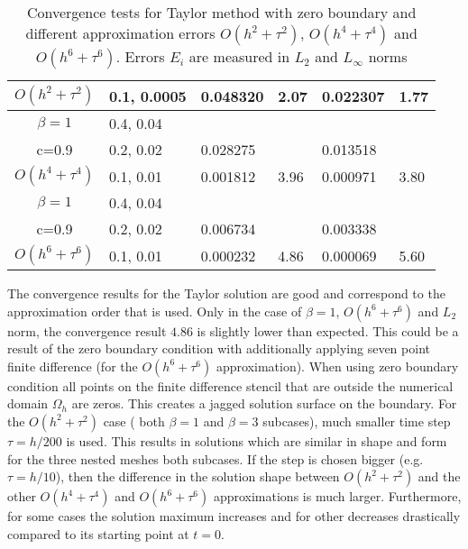 \documentclass[%
 aip,
cp,  %
 amsmath,amssymb,%
 reprint,%
]{revtex4-2}
\begin{document}
\begin{table}[ht]
\begin{tabular}{||c|l|ll|ll||}
  $O(h^2+ \tau^2)$ &0.1, 0.0005   &0.048320   &2.07  &0.022307  & 1.77 \\
			\hline
      $\beta=1$               &0.4, 0.04    &            &               &             &    \\
       c=0.9                     &0.2, 0.02     & 0.028275   &        &  0.013518   &   \\
       $O(h^4+ \tau^4)$ &0.1, 0.01   &0.001812 & 3.96  & 0.000971  & 3.80  \\
    \hline
  $\beta=1$     &0.4, 0.04   &            &          &                  &      \\
      c=0.9                    &0.2, 0.02   &0.006734 &           & 0.003338      &       \\
     $O(h^6+ \tau^6)$ &0.1, 0.01 & 0.000232 &4.86 & 0.000069  & 5.60        \\
	   \hline
			\hline 
		\end{tabular}
		\caption{Convergence tests for Taylor method with zero boundary and different approximation errors $O(h^{2} + \tau^2 )$, $O(h^{4} + \tau^4 )$ and $O(h^{6} + \tau^6 )$. Errors $E_i$ are measured in $L_2$ and $L_\infty$ norms}
\label{tableA}
\end{table}

The convergence results for the Taylor solution are good and correspond to the approximation order that is used. Only in the case of $\beta = 1$, $O(h^6 + \tau^6)$ and $L_2$ norm, the convergence result $4.86$ is slightly lower than expected. This could be a result of the zero boundary condition with additionally applying seven point finite difference (for the $O(h^6 + \tau^6)$ approximation). When using zero boundary condition all points on the finite difference stencil that are outside the numerical domain $\Omega_h$ are zeros. This creates a jagged solution surface on the boundary. For the $O(h^2 + \tau^2)$ case ( both $\beta = 1$ and $\beta = 3$ subcases), much smaller time step  $\tau = h/200$ is used. This results in solutions which are similar in shape and form for the three nested meshes both subcases. If the step is chosen bigger (e.g. $\tau = h/10$), then the difference in the solution shape between $O(h^2 + \tau^2)$ and the other $O(h^4 + \tau^4)$ and $O(h^6 + \tau^6)$ approximations is much larger. Furthermore, for some cases the solution maximum increases and for other decreases drastically compared to its starting point at $t=0$.
\end{document}
